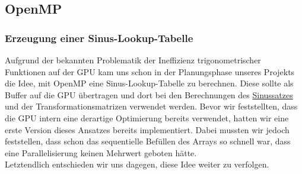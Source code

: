 \subsection{OpenMP}
\subsubsection*{Erzeugung einer Sinus-Lookup-Tabelle}
\vspace{-0.25cm}
Aufgrund der bekannten Problematik der Ineffizienz trigonometrischer Funktionen auf der GPU kam uns schon in der Planungsphase
unseres Projekts die Idee, mit OpenMP eine Sinus-Lookup-Tabelle zu berechnen. Diese sollte als Buffer auf die GPU übertragen
und dort bei den Berechnungen des \hyperref[Sinussatz]{Sinussatzes} und der Transformationsmatrizen verwendet werden.
Bevor wir feststellten, dass die GPU intern eine derartige Optimierung bereits verwendet, hatten wir eine erste Version dieses 
Ansatzes bereits implementiert. Dabei mussten wir jedoch feststellen, dass schon das sequentielle Befüllen des Arrays so schnell war,
dass eine Parallelisierung keinen Mehrwert geboten hätte.\\
Letztendlich entschieden wir uns dagegen, diese Idee weiter zu verfolgen.

